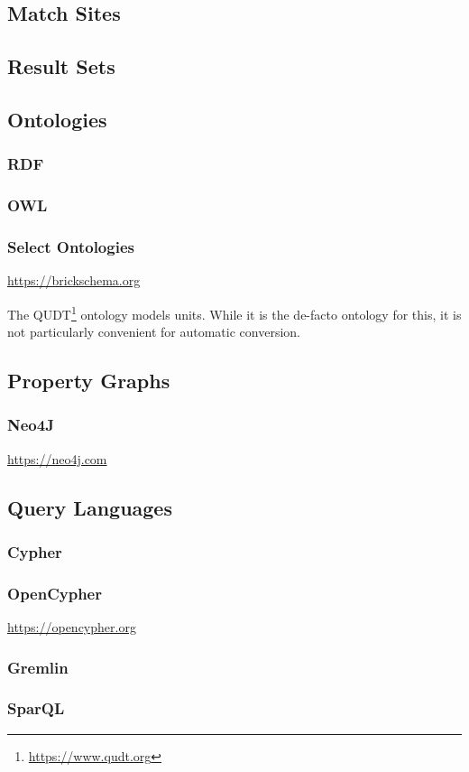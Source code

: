 \subsection{Match Sites}



\subsection{Result Sets}



\subsection{Ontologies}
\subsubsection{RDF}
\subsubsection{OWL}
\subsubsection{Select Ontologies}

\url{https://brickschema.org}



The QUDT\footnote{\url{https://www.qudt.org}} ontology models units. While it is the de-facto ontology for this, it is not particularly convenient for automatic conversion.

\subsection{Property Graphs}
\subsubsection{Neo4J}

\url{https://neo4j.com}

\subsection{Query Languages}
\subsubsection{Cypher}
\subsubsection{OpenCypher}

\url{https://opencypher.org}

\subsubsection{Gremlin}
\subsubsection{SparQL}


